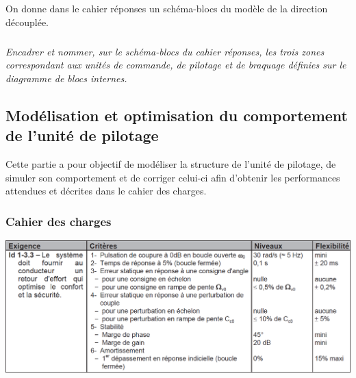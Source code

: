\documentclass[10pt,fleqn]{article} %
\begin{document}
On donne dans le cahier réponses un schéma-blocs du modèle de la direction découplée.




\subparagraph{}
\textit{Encadrer et nommer, sur le schéma-blocs du cahier réponses, les trois zones correspondant aux
unités de commande, de pilotage et de braquage définies sur le diagramme de blocs internes.}
\ifprof
\begin{corrige}
\end{corrige}
\else
\fi

\subsection{Modélisation et optimisation du comportement de l'unité de pilotage}

\begin{obj}
Cette partie a pour objectif de modéliser la structure de l'unité de pilotage, de simuler son
comportement et de corriger celui-ci afin d'obtenir les performances attendues et décrites
dans le cahier des charges.
\end{obj}

\subsubsection*{Cahier des charges}

\begin{center}
\includegraphics[width=\linewidth]{images/fig_12}

\end{center}
\end{document}
